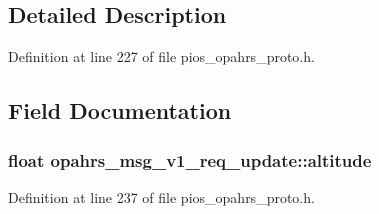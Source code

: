 \subsection{Detailed Description}


Definition at line 227 of file pios\-\_\-opahrs\-\_\-proto.\-h.



\subsection{Field Documentation}
\hypertarget{structopahrs__msg__v1__req__update_acc0659ea2d77b607cbe65b422e47aaa0}{
\subsubsection[{altitude}]{\setlength{\rightskip}{0pt plus 5cm}float opahrs\-\_\-msg\-\_\-v1\-\_\-req\-\_\-update\-::altitude}}\label{structopahrs__msg__v1__req__update_acc0659ea2d77b607cbe65b422e47aaa0}


Definition at line 237 of file pios\-\_\-opahrs\-\_\-proto.\-h.

